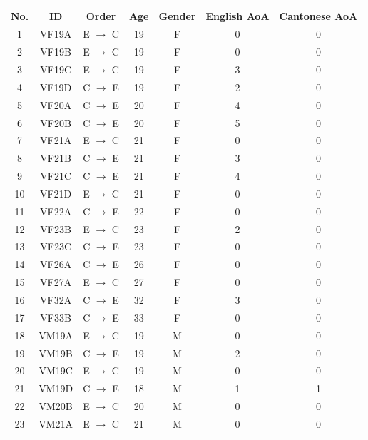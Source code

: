\begin{table}[!htbp]
\begin{center}
\begin{tabular}{ccccccc}
\toprule
\textbf{No.} & \textbf{ID} & \textbf{Order} & \textbf{Age} & \textbf{Gender} & \textbf{English AoA} & \textbf{Cantonese AoA} \\
\midrule
1 & VF19A & E $\rightarrow$ C & 19  & F & 0   & 0 \\
2 & VF19B & E $\rightarrow$ C & 19  & F & 0   & 0 \\
3 & VF19C & E $\rightarrow$ C & 19  & F & 3   & 0 \\
4 & VF19D & C $\rightarrow$ E & 19  & F & 2   & 0 \\
5 & VF20A & C $\rightarrow$ E & 20  & F & 4   & 0 \\
6 & VF20B & C $\rightarrow$ E & 20  & F & 5   & 0 \\
7 & VF21A & E $\rightarrow$ C & 21  & F & 0   & 0 \\
8 & VF21B & C $\rightarrow$ E & 21  & F & 3   & 0 \\
9 & VF21C & C $\rightarrow$ E & 21  & F & 4   & 0 \\
10  & VF21D & E $\rightarrow$ C & 21  & F & 0   & 0 \\
11  & VF22A & C $\rightarrow$ E & 22  & F & 0   & 0 \\
12  & VF23B & E $\rightarrow$ C & 23  & F & 2   & 0 \\
13  & VF23C & C $\rightarrow$ E & 23  & F & 0   & 0 \\
14  & VF26A & C $\rightarrow$ E & 26  & F & 0   & 0 \\
15  & VF27A & E $\rightarrow$ C & 27  & F & 0   & 0 \\
16  & VF32A & C $\rightarrow$ E & 32  & F & 3   & 0 \\
17  & VF33B & C $\rightarrow$ E & 33  & F & 0   & 0 \\
18  & VM19A & E $\rightarrow$ C & 19  & M & 0   & 0 \\
19  & VM19B & C $\rightarrow$ E & 19  & M & 2   & 0 \\
20  & VM19C & E $\rightarrow$ C & 19  & M & 0   & 0 \\
21  & VM19D & C $\rightarrow$ E & 18  & M & 1   & 1 \\
22  & VM20B & E $\rightarrow$ C & 20  & M & 0   & 0 \\
23  & VM21A & E $\rightarrow$ C & 21  & M & 0   & 0 \\

\end{tabular}
\end{center}
\end{table}
